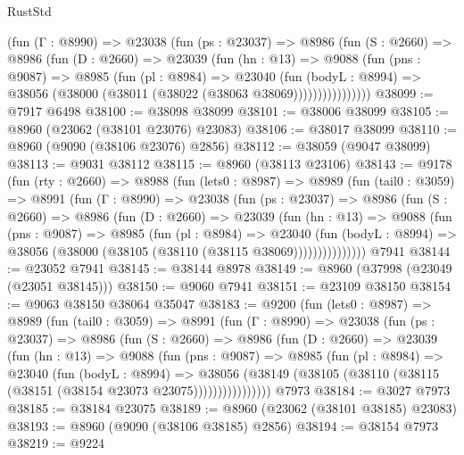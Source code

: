 \begin{lexlean}{RustStd}
\begin{coremodule}
            (fun (Γ : @8990) =>
            @23038
              (fun (ps : @23037) =>
              @8986
                (fun (S : @2660) =>
                @8986
                  (fun (D : @2660) =>
                  @23039
                    (fun (hn : @13) =>
                    @9088
                      (fun (pns : @9087) =>
                      @8985
                        (fun (pl : @8984) =>
                        @23040
                          (fun (bodyL : @8994) =>
                          @38056 (@38000 (@38011 (@38022 (@38063 @38069))))))))))))))))
@38099 := @7917 @6498
@38100 := @38098 @38099
@38101 := @38006 @38099
@38105 := @8960 (@23062 (@38101 @23076) @23083)
@38106 := @38017 @38099
@38110 := @8960 (@9090 (@38106 @23076) @2856)
@38112 := @38059 (@9047 @38099)
@38113 := @9031 @38112
@38115 := @8960 (@38113 @23106)
@38143 := @9178
    (fun (rty : @2660) =>
    @8988
      (fun (lets0 : @8987) =>
      @8989
        (fun (tail0 : @3059) =>
        @8991
          (fun (Γ : @8990) =>
          @23038
            (fun (ps : @23037) =>
            @8986
              (fun (S : @2660) =>
              @8986
                (fun (D : @2660) =>
                @23039
                  (fun (hn : @13) =>
                  @9088
                    (fun (pns : @9087) =>
                    @8985
                      (fun (pl : @8984) =>
                      @23040
                        (fun (bodyL : @8994) =>
                        @38056 (@38000 (@38105 (@38110 (@38115 @38069)))))))))))))))
    @7941
@38144 := @23052 @7941
@38145 := @38144 @8978
@38149 := @8960 (@37998 (@23049 (@23051 @38145)))
@38150 := @9060 @7941
@38151 := @23109 @38150
@38154 := @9063 @38150 @38064 @35047
@38183 := @9200
    (fun (lets0 : @8987) =>
    @8989
      (fun (tail0 : @3059) =>
      @8991
        (fun (Γ : @8990) =>
        @23038
          (fun (ps : @23037) =>
          @8986
            (fun (S : @2660) =>
            @8986
              (fun (D : @2660) =>
              @23039
                (fun (hn : @13) =>
                @9088
                  (fun (pns : @9087) =>
                  @8985
                    (fun (pl : @8984) =>
                    @23040
                      (fun (bodyL : @8994) =>
                      @38056
                        (@38149
                          (@38105 (@38110 (@38115 (@38151 (@38154 @23073 @23075))))))))))))))))
    @7973
@38184 := @3027 @7973
@38185 := @38184 @23075
@38189 := @8960 (@23062 (@38101 @38185) @23083)
@38193 := @8960 (@9090 (@38106 @38185) @2856)
@38194 := @38154 @7973
@38219 := @9224

\end{coremodule}
\end{lexlean}
